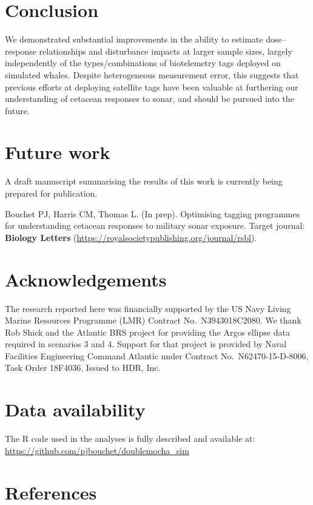 \documentclass[
]{article}
\begin{document}
\section{Conclusion}

We demonstrated substantial improvements in the ability to estimate dose--response relationships and disturbance impacts at larger sample sizes, largely independently of the types/combinations of biotelemetry tags deployed on simulated whales. Despite heterogeneous measurement error, this suggests that previous efforts at deploying satellite tags have been valuable at furthering our understanding of cetacean responses to sonar, and should be pursued into the future.

\section{Future work}

A draft manuscript summarising the results of this work is currently being prepared for publication.

Bouchet PJ, Harris CM, Thomas L. (In prep). Optimising tagging programmes for understanding cetacean responses to military sonar exposure. Target journal: \textbf{Biology Letters} (\url{https://royalsocietypublishing.org/journal/rsbl}).

\section{Acknowledgements}

The research reported here was ﬁnancially supported by the US Navy Living Marine Resources Programme (LMR) Contract No.~N3943018C2080. We thank Rob Shick and the Atlantic BRS project for providing the Argos ellipse data required in scenarios 3 and 4. Support for that project is provided by Naval Facilities Engineering Command Atlantic under Contract No.~N62470-15-D-8006, Task Order 18F4036, Issued to HDR, Inc.~

\section{Data availability}

The R code used in the analyses is fully described and available at: \url{https://github.com/pjbouchet/doublemocha_sim}

\section{References}
\end{document}
